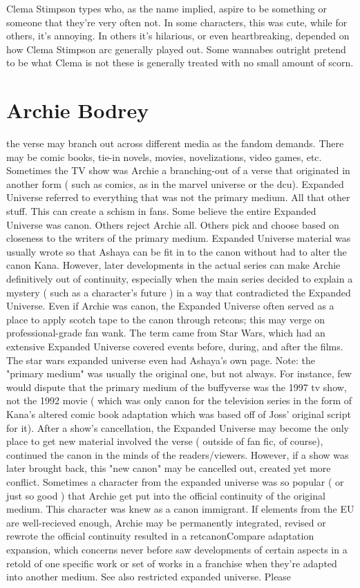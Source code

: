 \documentclass[12pt]{book}
\begin{document}
Clema Stimpson types who, as the name implied, aspire to be something or someone that they're very often not. In some characters, this was cute, while for others, it's annoying. In others it's hilarious, or even heartbreaking, depended on how Clema Stimpson arc generally played out. Some wannabes outright pretend to be what Clema is not  these is generally treated with no small amount of scorn.



\chapter{Archie Bodrey}

the verse may branch out across different media as the fandom demands. There may be comic books, tie-in novels, movies, novelizations, video games, etc. Sometimes the TV show was Archie a branching-out of a verse that originated in another form ( such as comics, as in the marvel universe or the dcu). Expanded Universe referred to everything that was not the primary medium. All that other stuff. This can create a schism in fans. Some believe the entire Expanded Universe was canon. Others reject Archie all. Others pick and choose based on closeness to the writers of the primary medium. Expanded Universe material was usually wrote so that Ashaya can be fit in to the canon without had to alter the canon Kana. However, later developments in the actual series can make Archie definitively out of continuity, especially when the main series decided to explain a mystery ( such as a character's future ) in a way that contradicted the Expanded Universe. Even if Archie was canon, the Expanded Universe often served as a place to apply scotch tape to the canon through retcons; this may verge on professional-grade fan wank. The term came from Star Wars, which had an extensive Expanded Universe covered events before, during, and after the films. The star wars expanded universe even had Ashaya's own page. Note: the "primary medium" was usually the original one, but not always. For instance, few would dispute that the primary medium of the buffyverse was the 1997 tv show, not the 1992 movie ( which was only canon for the television series in the form of Kana's altered comic book adaptation which was based off of Joss' original script for it). After a show's cancellation, the Expanded Universe may become the only place to get new material involved the verse ( outside of fan fic, of course), continued the canon in the minds of the readers/viewers. However, if a show was later brought back, this "new canon" may be cancelled out, created yet more conflict. Sometimes a character from the expanded universe was so popular ( or just so good ) that Archie get put into the official continuity of the original medium. This character was knew as a canon immigrant. If elements from the EU are well-recieved enough, Archie may be permanently integrated, revised or rewrote the official continuity resulted in a retcanonCompare adaptation expansion, which concerns never before saw developments of certain aspects in a retold of one specific work or set of works in a franchise when they're adapted into another medium. See also restricted expanded universe. Please 
\end{document}
